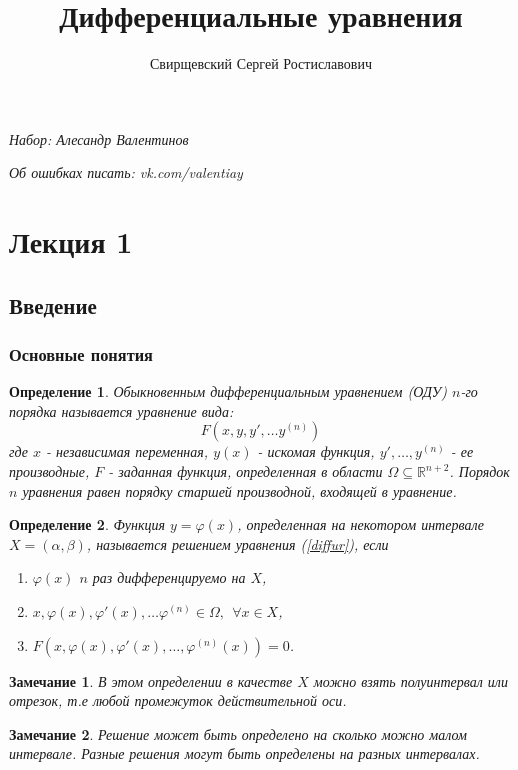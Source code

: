 \documentclass{article}
\author{Свирщевский Сергей Ростиславович}
\title{Дифференциальные уравнения}
\newtheorem*{df}{Определение}
\newtheorem*{ntc}{Замечание}
\begin{document}
  \begin{titlepage}
  \maketitle
  \centering
  {\itshape\footnotesize Набор: Алесандр Валентинов}

  {\itshape\footnotesize Об ошибках писать: vk.com/valentiay}
  \tableofcontents
  \vfill
  \end{titlepage}
  
  \section{Лекция 1}
  \subsection{Введение}
  \subsubsection{Основные понятия}
  \begin{df}
  Обыкновенным дифференциальным уравнением {(ОДУ)} $n$-го порядка называется уравнение вида:
  \begin{equation}
  \label{diffur}
  F(x, y, y', \ldots y^{(n)})
  \end{equation}
  где $x$ - независимая переменная, $y(x)$ - искомая функция, $ y', \ldots, y^{(n)} $ - ее производные, $F$ - заданная функция, определенная в области $\Omega \subseteq \mathbb{R}^{n+2}$. Порядок $n$ уравнения равен порядку старшей производной, входящей в уравнение. 
  \end{df}
  
  \begin{df}
  Функция $y = \varphi(x)$, определенная на некотором интервале $X = (\alpha, \beta)$, называется решением уравнения (\ref{diffur}), если 
  \begin{enumerate}
  \item $\varphi(x)$ $n$ раз дифференцируемо на $X$,
  \item $x, \varphi(x), \varphi'(x), \ldots \varphi^{(n)} \in \Omega,~~ \forall x \in X$,
  \item $F(x, \varphi(x), \varphi'(x), \ldots, \varphi^{(n)}(x)) = 0$.
  \end{enumerate}
  \end{df}
  \begin{ntc}
  В этом определении в качестве $X$ можно взять полуинтервал или отрезок, т.е любой промежуток действительной оси.
  \end{ntc}
  \begin{ntc}
  Решение может быть определено на сколько можно малом интервале. Разные решения могут быть определены на разных интервалах.
  \end{ntc}
  
\end{document}

